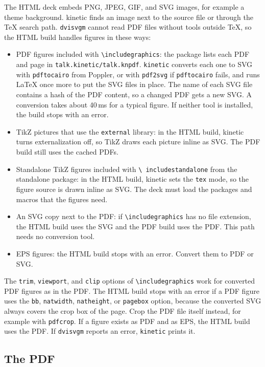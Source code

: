 \documentclass[11pt]{article}
\newcommand{\pkg}{\textsf{kinetic}}
\newcommand{\cmd}[1]{\texttt{#1}}
\begin{document}
The HTML deck embeds PNG, JPEG, GIF, and SVG images, for example a theme
background. \pkg{} finds an image next to the source file or through the TeX
search path. \cmd{dvisvgm} cannot read PDF files without tools outside TeX, so
the HTML build handles figures in these ways:
\begin{itemize}
	\item PDF figures included with \cmd{\textbackslash includegraphics}: the
	      package lists each PDF and page in \cmd{talk.kinetic/talk.knpdf}.
	      \cmd{kinetic} converts each one to SVG with \cmd{pdftocairo} from Poppler,
	      or with \cmd{pdf2svg} if \cmd{pdftocairo} fails, and runs LaTeX once more
	      to put the SVG files in place. The name of each SVG file contains a hash of
	      the PDF content, so a changed PDF gets a new SVG. A conversion takes about
	      40\,ms for a typical figure. If neither tool is installed, the build stops
	      with an error.
	\item TikZ pictures that use the \cmd{external} library: in the HTML build,
	      \pkg{} turns externalization off, so TikZ draws each picture inline as SVG.
	      The PDF build still uses the cached PDFs.
	\item Standalone TikZ figures included with \cmd{\textbackslash
		      includestandalone} from the \textsf{standalone} package: in the HTML build,
	      \pkg{} sets the \cmd{tex} mode, so the figure source is drawn inline as
	      SVG. The deck must load the packages and macros that the figures need.
	\item An SVG copy next to the PDF: if \cmd{\textbackslash includegraphics}
	      has no file extension, the HTML build uses the SVG and the PDF build uses
	      the PDF. This path needs no conversion tool.
	\item EPS figures: the HTML build stops with an error. Convert them to PDF
	      or SVG.
\end{itemize}
The \cmd{trim}, \cmd{viewport}, and \cmd{clip} options of
\cmd{\textbackslash includegraphics} work for converted PDF figures as in the
PDF. The HTML build stops with an error if a PDF figure uses the \cmd{bb},
\cmd{natwidth}, \cmd{natheight}, or \cmd{pagebox} option, because the converted
SVG always covers the crop box of the page. Crop the PDF file itself instead,
for example with \cmd{pdfcrop}. If
a figure exists as PDF and as EPS, the HTML build uses the PDF. If \cmd{dvisvgm} reports an error,
\cmd{kinetic} prints it.

\subsection{The PDF}
\end{document}
